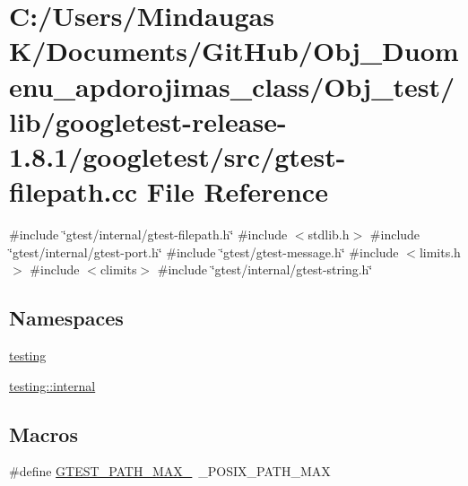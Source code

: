 \hypertarget{_obj__test_2lib_2googletest-release-1_88_81_2googletest_2src_2gtest-filepath_8cc}{}\section{C\+:/\+Users/\+Mindaugas K/\+Documents/\+Git\+Hub/\+Obj\+\_\+\+Duomenu\+\_\+apdorojimas\+\_\+class/\+Obj\+\_\+test/lib/googletest-\/release-\/1.8.1/googletest/src/gtest-\/filepath.cc File Reference}
\label{_obj__test_2lib_2googletest-release-1_88_81_2googletest_2src_2gtest-filepath_8cc}
{\ttfamily \#include \char`\"{}gtest/internal/gtest-\/filepath.\+h\char`\"{}}\newline
{\ttfamily \#include $<$stdlib.\+h$>$}\newline
{\ttfamily \#include \char`\"{}gtest/internal/gtest-\/port.\+h\char`\"{}}\newline
{\ttfamily \#include \char`\"{}gtest/gtest-\/message.\+h\char`\"{}}\newline
{\ttfamily \#include $<$limits.\+h$>$}\newline
{\ttfamily \#include $<$climits$>$}\newline
{\ttfamily \#include \char`\"{}gtest/internal/gtest-\/string.\+h\char`\"{}}\newline
\subsection*{Namespaces}
\begin{DoxyCompactItemize}
\item 
 \mbox{\hyperlink{namespacetesting}{testing}}
\item 
 \mbox{\hyperlink{namespacetesting_1_1internal}{testing\+::internal}}
\end{DoxyCompactItemize}
\subsection*{Macros}
\begin{DoxyCompactItemize}
\item 
\#define \mbox{\hyperlink{_obj__test_2lib_2googletest-release-1_88_81_2googletest_2src_2gtest-filepath_8cc_ad9d445747785a9271a57cf1d392b89ad}{G\+T\+E\+S\+T\+\_\+\+P\+A\+T\+H\+\_\+\+M\+A\+X\+\_\+}}~\+\_\+\+P\+O\+S\+I\+X\+\_\+\+P\+A\+T\+H\+\_\+\+M\+AX
\end{DoxyCompactItemize}


